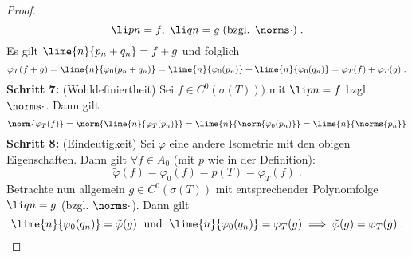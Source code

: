 \begin{proof}
	\[\li pn = f,\; \li qn = g \;\text{(bzgl. $\norms\cdot$)}\;.\]
	Es gilt \(\lime{n}{p_n + q_n}= f+g\) und folglich
	\[\varphi_T(f+g) = \lime{n}{\varphi_0(p_n + q_n)} = \lime{n}{\varphi_0(p_n)} + \lime{n}{\varphi_0(q_n)} = \varphi_T(f) + \varphi_T(g)\;.\]
	\textbf{Schritt 7:} (Wohldefiniertheit) Sei \(f\in C^0(\sigma(T)))\) mit \(\li pn = f\) bzgl. \(\norms\cdot\). Dann gilt 
	\[\norm{\varphi_T(f)} = \norm{\lime{n}{\varphi_T(p_n)}} = \lime{n}{\norm{\varphi_0(p_n)}} = \lime{n}{\norms{p_n}} \]
	\textbf{Schritt 8:} (Eindeutigkeit) Sei \(\tilde\varphi\) eine andere Isometrie mit den obigen Eigenschaften. Dann gilt \(\forall f \in A_0\) (mit $p$ wie in der Definition):
	\[\tilde \varphi(f) = \varphi_0(f) = p(T) = \varphi_T(f)\;.\]
	Betrachte nun allgemein \(g \in C^0(\sigma(T))\) mit entsprechender Polynomfolge \(\li qn = g\) (bzgl. $\norms\cdot$). Dann gilt
	\[\lime{n}{\varphi_0(q_n)} = \tilde\varphi(g) \;\text{ und }\; \lime{n}{\varphi_0(q_n)} =\varphi_T(g) \implies \tilde\varphi(g) = \varphi_T(g)\;.\]
	\end{proof}
